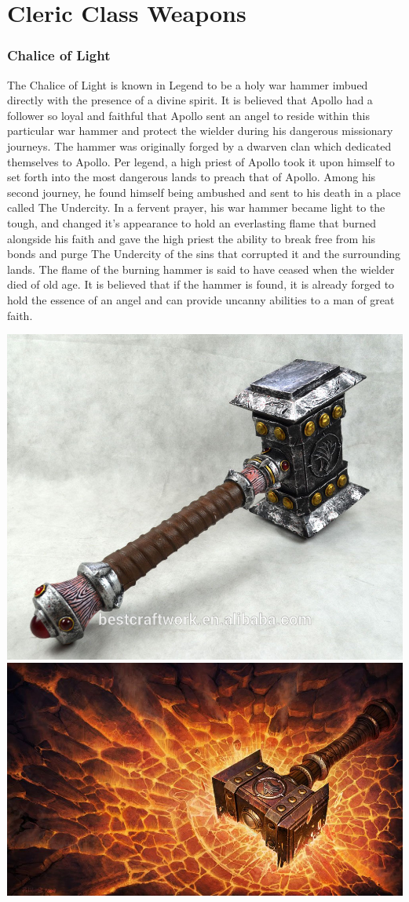 \section{Cleric Class Weapons}

\subsubsection{Chalice of Light}

The Chalice of Light is known in Legend to be a holy war hammer imbued directly with the presence of a divine spirit. It is believed that Apollo had a follower so loyal and faithful that Apollo sent an angel to reside within this particular war hammer and protect the wielder during his dangerous missionary journeys. The hammer was originally forged by a dwarven clan which dedicated themselves to Apollo. Per legend, a high priest of Apollo took it upon himself to set forth into the most dangerous lands to preach that of Apollo. Among his second journey, he found himself being ambushed and sent to his death in a place called The Undercity. In a fervent prayer, his war hammer became light to the tough, and changed it's appearance to hold an everlasting flame that burned alongside his faith and gave the high priest the ability to break free from his bonds and purge The Undercity of the sins that corrupted it and the surrounding lands. The flame of the burning hammer is said to have ceased when the wielder died of old age. It is believed that if the hammer is found, it is already forged to hold the essence of an angel and can provide uncanny abilities to a man of great faith.

\begin{center}
	\includegraphics[width=0.41\linewidth]{img/weapons/Wow-Hammer.jpg} 	\includegraphics[width=0.57\linewidth]{img/weapons/shatteredhand.jpg}
\end{center}

